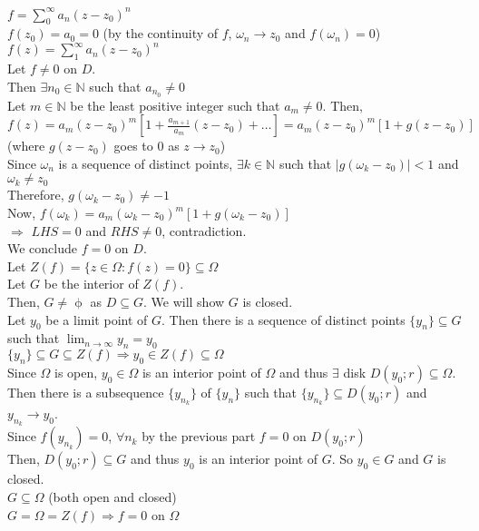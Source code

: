 $f= \sum_{0}^{\infty} a_n(z-z_0)^n$\\
$f(z_0)=a_0=0$ (by the continuity of $f$, $\omega_n\rightarrow z_0$ and $f(\omega_n)=0$)\\
$f(z)=\sum_{1}^{\infty} a_n(z-z_0)^n$\\
Let $f\neq 0$ on $D$.\\
Then $\exists n_0\in \mathbb{N}$ such that $a_{n_0}\neq 0$\\
Let $m\in \mathbb{N}$ be the least positive integer such that $a_m\neq 0$. Then,\\
$f(z)= a_m(z-z_0)^m[1+\frac{a_{m+1}}{a_m}(z-z_0)+\dots]= a_m(z-z_0)^m[1+g(z-z_0)]$ (where $g(z-z_0)$ goes to $0$ as $z\rightarrow z_0$)\\
Since {$\omega_n$} is a sequence of distinct points, $\exists k\in \mathbb{N}$ such that $|g(\omega_k-z_0)|<1$ and $\omega_k \neq z_0$\\
Therefore, $g(\omega_k-z_0)\neq -1$\\
Now, $f(\omega_k)=a_m(\omega_k-z_0)^m[1+g(\omega_k-z_0)]$\\
$\Rightarrow$ $LHS=0$ and $RHS\neq 0$, contradiction. \\
We conclude $f=0$ on $D$.\\
Let $Z(f)= \{z\in \Omega: f(z)=0\}\subseteq \Omega$\\
Let $G$ be the interior of $Z(f)$.\\
Then, $G\neq \upphi$ as $D\subseteq G$. We will show $G$ is closed.\\
Let $y_0$ be a limit point of $G$. Then there is a sequence of distinct points $\{y_n\}\subseteq G$ such that $\lim_{n \to \infty} y_n=y_0$\\
$\{y_n\}\subseteq G\subseteq Z(f)\Rightarrow y_0\in Z(f)\subseteq \Omega$\\
Since $\Omega$ is open, $y_0\in \Omega$ is an interior point of $\Omega$ and thus $\exists$ disk $D(y_0;r)\subseteq \Omega$.\\
Then there is a subsequence $\{y_{n_k}\}$ of $\{y_n\}$ such that  $\{y_{n_k}\} \subseteq D(y_0;r)$ and $y_{n_k}\rightarrow y_0$.\\
Since $f(y_{n_k})=0$, $\forall n_k$ by the previous part $f=0$ on $D(y_0;r)$\\
Then, $D(y_0;r)\subseteq G$ and thus $y_0$ is an interior point of $G$. So $y_0\in G$ and $G$ is closed.\\
$G\subseteq \Omega$ (both open and closed)\\
$G=\Omega=Z(f)\Rightarrow f=0$ on $\Omega$\\
